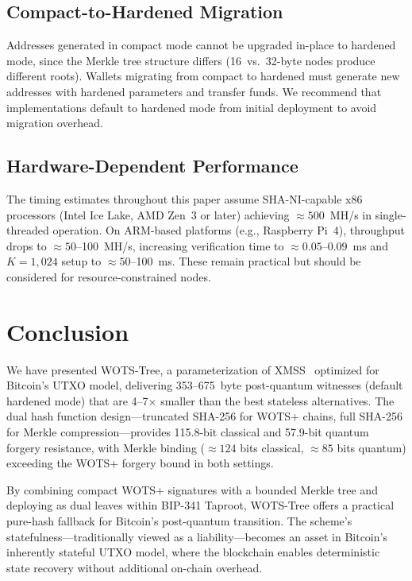 \documentclass[11pt,a4paper]{article}
\theoremstyle{definition}
\begin{document}
\subsection{Compact-to-Hardened Migration}
Addresses generated in compact mode cannot be upgraded in-place to hardened mode, since the Merkle tree structure differs (16~vs.\ 32-byte nodes produce different roots). Wallets migrating from compact to hardened must generate new addresses with hardened parameters and transfer funds. We recommend that implementations default to hardened mode from initial deployment to avoid migration overhead.

\subsection{Hardware-Dependent Performance}
The timing estimates throughout this paper assume SHA-NI-capable x86 processors (Intel Ice Lake, AMD Zen~3 or later) achieving $\approx 500$~MH/s in single-threaded operation. On ARM-based platforms (e.g., Raspberry Pi~4), throughput drops to $\approx 50$--100~MH/s, increasing verification time to $\approx 0.05$--0.09~ms and $K = 1{,}024$ setup to $\approx 50$--100~ms. These remain practical but should be considered for resource-constrained nodes.

\section{Conclusion}
\label{sec:conclusion}

We have presented WOTS-Tree, a parameterization of XMSS~\cite{rfc8391} optimized for Bitcoin's UTXO model, delivering 353--675~byte post-quantum witnesses (default hardened mode) that are 4--7$\times$ smaller than the best stateless alternatives. The dual hash function design---truncated SHA-256 for WOTS+ chains, full SHA-256 for Merkle compression---provides 115.8-bit classical and 57.9-bit quantum forgery resistance, with Merkle binding ($\approx 124$ bits classical, $\approx 85$ bits quantum) exceeding the WOTS+ forgery bound in both settings.

By combining compact WOTS+ signatures with a bounded Merkle tree and deploying as dual leaves within BIP-341 Taproot, WOTS-Tree offers a practical pure-hash fallback for Bitcoin's post-quantum transition. The scheme's statefulness---traditionally viewed as a liability---becomes an asset in Bitcoin's inherently stateful UTXO model, where the blockchain enables deterministic state recovery without additional on-chain overhead.
\end{document}
